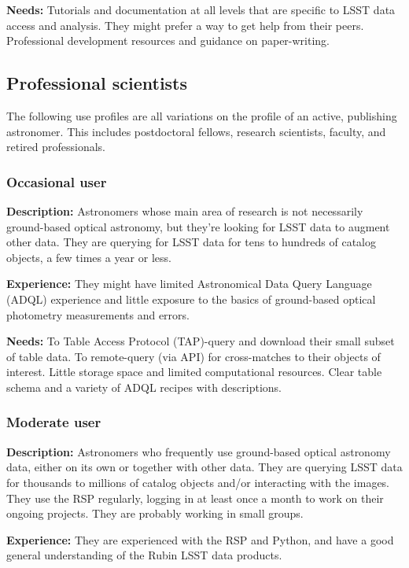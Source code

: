 \textbf{Needs:}
Tutorials and documentation at all levels that are specific to LSST data access and analysis.
They might prefer a way to get help from their peers.
Professional development resources and guidance on paper-writing.

\subsection{Professional scientists}

The following use profiles are all variations on the profile of an
active, publishing astronomer.
This includes postdoctoral fellows, research scientists, faculty, and
retired professionals. 

\subsubsection{Occasional user}

\textbf{Description:}
Astronomers whose main area of research is not necessarily ground-based
optical astronomy, but they're looking for LSST data to augment other data.
They are querying for LSST data for tens to hundreds of catalog objects, a few times 
a year or less.

\textbf{Experience:}
They might have limited Astronomical Data Query Language (ADQL) experience and little exposure to the
basics of ground-based optical photometry measurements and errors.

\textbf{Needs:}
To Table Access Protocol (TAP)-query and download their small subset of table data.
To remote-query (via API) for cross-matches to their objects of interest.
Little storage space and limited computational resources.
Clear table schema and a variety of ADQL recipes with descriptions.

\subsubsection{Moderate user}

\textbf{Description:}
Astronomers who frequently use ground-based optical astronomy data, either on its own
or together with other data.
They are querying LSST data for thousands to millions of catalog objects and/or
interacting with the images.
They use the RSP regularly, logging in at least once a month to work on their
ongoing projects.
They are probably working in small groups.

\textbf{Experience:}
They are experienced with the RSP and Python, and have a good general understanding
of the Rubin LSST data products.

